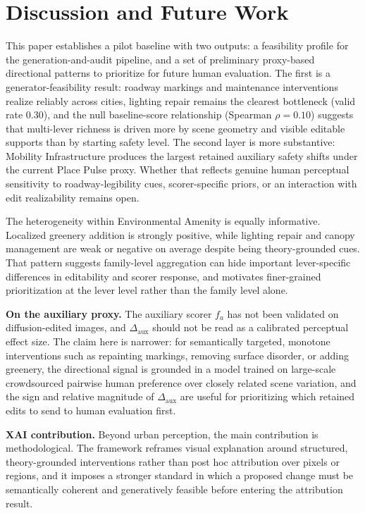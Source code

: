\section{Discussion and Future Work}
\label{sec:discussion}

This paper establishes a pilot baseline with two outputs: a feasibility
profile for the generation-and-audit pipeline, and a set of preliminary
proxy-based directional patterns to prioritize for future human
evaluation. The first is a generator-feasibility result: roadway
markings and maintenance interventions realize reliably across cities,
lighting repair remains the clearest bottleneck (valid rate 0.30), and
the null baseline-score relationship (Spearman $\rho{=}0.10$) suggests
that multi-lever richness is driven more by scene geometry and visible
editable supports than by starting safety level. The second layer is
more substantive: Mobility
Infrastructure produces the largest retained auxiliary safety shifts
under the current Place Pulse proxy. Whether that reflects genuine human
perceptual sensitivity to roadway-legibility cues, scorer-specific
priors, or an interaction with edit realizability remains open.

The heterogeneity within Environmental Amenity is equally informative.
Localized greenery addition is strongly positive, while lighting repair
and canopy management are weak or negative on average despite being
theory-grounded cues. That pattern suggests family-level aggregation can
hide important lever-specific differences in editability and scorer
response, and motivates finer-grained prioritization at the lever level
rather than the family level alone.

\noindent\textbf{On the auxiliary proxy.} The auxiliary scorer
$f_a$ has not been validated on diffusion-edited images, and
$\Delta_{\mathrm{aux}}$ should not be read as a calibrated perceptual
effect size. The claim here is narrower: for semantically targeted,
monotone interventions such as repainting markings, removing surface
disorder, or adding greenery, the directional signal is grounded in a
model trained on large-scale crowdsourced pairwise human preference over
closely related scene variation, and the sign and relative magnitude of
$\Delta_{\mathrm{aux}}$ are useful for prioritizing which retained edits
to send to human evaluation first.

\noindent\textbf{XAI contribution.} Beyond urban perception, the main
contribution is methodological. The framework reframes visual
explanation around structured, theory-grounded interventions rather than
post hoc attribution over pixels or regions, and it imposes a stronger
standard in which a proposed change must be semantically coherent and
generatively feasible before entering the attribution result.

